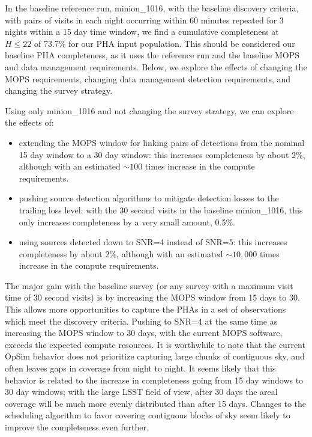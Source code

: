 In the baseline reference run, minion\_1016, with the baseline discovery criteria, with pairs of visits in each night occurring within 60 minutes repeated for 3 nights within a 15 day time window, we find a cumulative completeness at $H\le22$ of 73.7\% for our PHA input population. This should be considered our baseline PHA completeness, as it uses the reference run and the baseline MOPS and data management requirements. Below, we explore the effects of changing the MOPS requirements, changing data management detection requirements, and changing the survey strategy. 

Using only minion\_1016 and not changing the survey strategy, we can explore the effects of:
\begin{itemize}
\item extending the MOPS window for linking pairs of detections from the nominal 15 day window to a 30 day window: this increases completeness by about 2\%, although with an estimated $\sim100$ times increase in the compute requirements. 
\item pushing source detection algorithms to mitigate detection losses to the trailing loss level: with the 30 second visits in the baseline minion\_1016, this only increases completeness by a very small amount, 0.5\%.
\item using sources detected down to SNR=4 instead of SNR=5: this increases completeness by about 2\%, although with an estimated $\sim10,000$ times increase in the compute requirements. 
\end{itemize}

The major gain with the baseline survey (or any survey with a maximum visit time of 30 second visits) is by increasing the MOPS window from 15 days to 30. This allows more opportunities to capture the PHAs in a set of observations which meet the discovery criteria. Pushing to SNR=4 at the same time as increasing the MOPS window to 30 days, with the current MOPS software, exceeds the expected compute resources. It is worthwhile to note that the current OpSim behavior does not prioritize capturing large chunks of contiguous sky, and often leaves gaps in coverage from night to night. It seems likely that this behavior is related to the increase in completeness going from 15 day windows to 30 day windows; with the large LSST field of view, after 30 days the areal coverage will be much more evenly distributed than after 15 days. Changes to the scheduling algorithm to favor covering contiguous blocks of sky seem likely to improve the completeness even further. 

